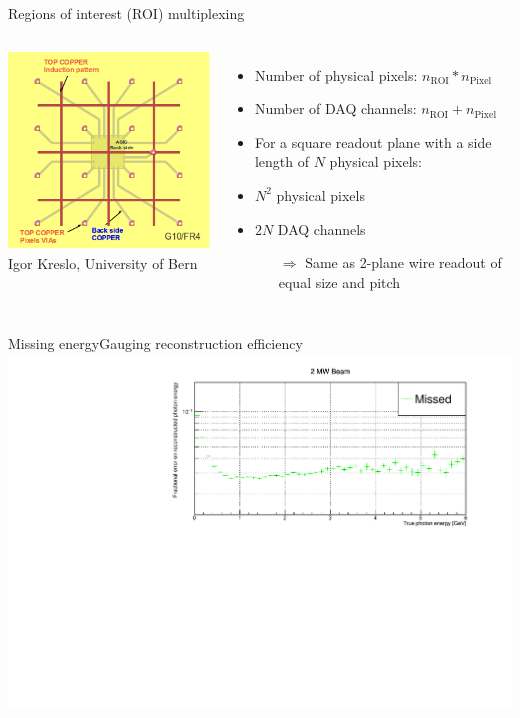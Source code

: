 \documentclass[]{beamer}
\newcommand*{\m}{\mathrm}
\newcommand*{\emphcol}{red}
\begin{document}
\begin{frame}{Regions of interest (ROI) multiplexing}
	\begin{columns}[c]
		\centering
		\includegraphics[width=\textwidth]{defence/roi}\\
		{\tiny Igor Kreslo, University of Bern}\\
		\begin{itemize}
			\item Number of physical pixels: {\color{\emphcol} $n_{\m{ROI}} * n_{\m{Pixel}}$}
			\item Number of DAQ channels: {\color{\emphcol} $n_{\m{ROI}} + n_{\m{Pixel}}$}
			\item For a square readout plane with a side length of $N$ physical pixels:
			\item $N ^ 2$ physical pixels
			\item $2 N$ DAQ channels
			\begin{itemize}
				\item[$\Rightarrow$] Same as 2-plane wire readout of equal size and pitch
			\end{itemize}
		\end{itemize}
	\end{columns}
\end{frame}

\begin{frame}{Missing energy}{Gauging reconstruction efficiency}
	\centering
	\includegraphics[width=\textwidth]{pile-up/2MW/missed_rel_x}
\end{frame}
\end{document}
